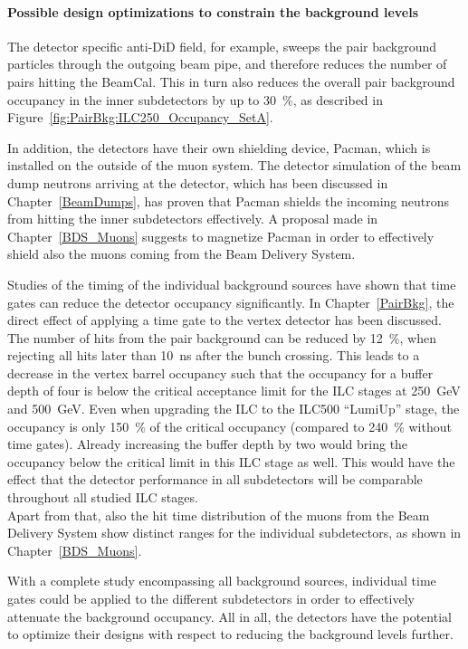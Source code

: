 \paragraph{Possible \sid design optimizations to constrain the background levels}

The detector specific anti-DiD field, for example, sweeps the pair background particles through the outgoing beam pipe, and therefore reduces the number of pairs hitting the \sid BeamCal.
This in turn also reduces the overall pair background occupancy in the inner subdetectors by up to \SI{30}{\percent}, as described in Figure~\ref{fig:PairBkg:ILC250_Occupancy_SetA}.

In addition, the detectors have their own shielding device, Pacman, which is installed on the outside of the muon system.
The detector simulation of the beam dump neutrons arriving at the \sid detector, which has been discussed in Chapter~\ref{BeamDumps}, has proven that Pacman shields the incoming neutrons from hitting the inner subdetectors effectively.
A proposal made in Chapter~\ref{BDS_Muons} suggests to magnetize Pacman in order to effectively shield also the muons coming from the Beam Delivery System.

Studies of the timing of the individual background sources have shown that time gates can reduce the detector occupancy significantly.
In Chapter~\ref{PairBkg}, the direct effect of applying a time gate to the \sid vertex detector has been discussed.
The number of hits from the pair background can be reduced by \SI{12}{\percent}, when rejecting all hits later than \SI{10}{\nano\second} after the bunch crossing.
This leads to a decrease in the vertex barrel occupancy such that the occupancy for a buffer depth of four is below the critical acceptance limit for the ILC stages at \SI{250}{\GeV} and \SI{500}{\GeV}. 
Even when upgrading the ILC to the ILC500 ``LumiUp'' stage, the occupancy is only \SI{150}{\percent} of the critical occupancy (compared to \SI{240}{\percent} without time gates).
Already increasing the buffer depth by two would bring the occupancy below the critical limit in this ILC stage as well.
This would have the effect that the detector performance in all \sid subdetectors will be comparable throughout all studied ILC stages.
\\Apart from that, also the hit time distribution of the muons from the Beam Delivery System show distinct ranges for the individual \sid subdetectors, as shown in Chapter~\ref{BDS_Muons}.

With a complete study encompassing all background sources, individual time gates could be applied to the different \sid subdetectors in order to effectively attenuate the background occupancy.
All in all, the detectors have the potential to optimize their designs with respect to reducing the background levels further.